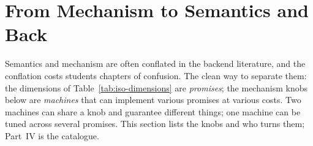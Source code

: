 \section{From Mechanism to Semantics and Back}
\label{sec:iso-mechanisms}

Semantics and mechanism are often conflated in the backend literature, and
the conflation costs students chapters of confusion. The clean way to separate
them: the dimensions of Table~\ref{tab:iso-dimensions} are \emph{promises};
the mechanism knobs below are \emph{machines} that can implement various
promises at various costs. Two machines can share a knob and guarantee
different things; one machine can be tuned across several promises. This
section lists the knobs and who turns them; Part~IV is the catalogue.

